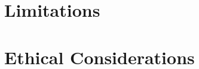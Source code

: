 \documentclass[11pt]{article}
\begin{document}
\section*{Limitations}

\section*{Ethical Considerations}




%
\end{document}
